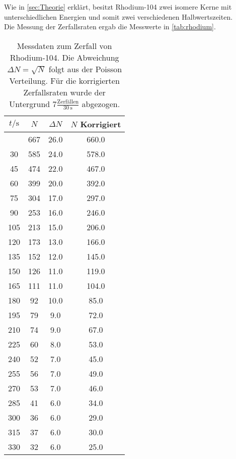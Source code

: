Wie in \autoref{sec:Theorie} erklärt, besitzt Rhodium-104 zwei isomere Kerne mit unterschiedlichen 
Energien und somit zwei verschiedenen Halbwertszeiten.
\\
Die Messung der Zerfallsraten ergab die Messwerte in \autoref{tab:rhodium}.
\begin{longtable}{c c c c}
	\caption{Messdaten zum Zerfall von Rhodium-104. Die Abweichung $\Delta N = \sqrt{N}$ folgt
		aus der Poisson Verteilung. Für die korrigierten Zerfallsraten wurde der Untergrund 
	$7 \frac{\text{Zerfällen}}{\SI{30}{\second}}$ abgezogen.} \label{tab:rhodium} \\
		\hline
		$t / \si{\second}$ & $N$ & $\Delta N$ &$N$ Korrigiert \\
		\hline
		\endhead
		\hline
		\endfoot
		15  	& 667  	& 26.0         	& 660.0 \\
		 30  	& 585  	& 24.0         	& 578.0 \\
		 45  	& 474  	& 22.0         	& 467.0 \\
		 60  	& 399  	& 20.0         	& 392.0 \\
		 75  	& 304  	& 17.0         	& 297.0 \\
		 90  	& 253  	& 16.0         	& 246.0 \\
		105  	& 213  	& 15.0         	& 206.0 \\
		120  	& 173  	& 13.0         	& 166.0 \\
		135  	& 152  	& 12.0         	& 145.0 \\
		150  	& 126  	& 11.0         	& 119.0 \\
		165  	& 111  	& 11.0         	& 104.0 \\
		180  	&  92  	& 10.0         	&  85.0 \\
		195  	&  79  	&  9.0         	&  72.0 \\
		210  	&  74  	&  9.0         	&  67.0 \\
		225  	&  60  	&  8.0         	&  53.0 \\
		240  	&  52  	&  7.0         	&  45.0 \\
		255  	&  56  	&  7.0         	&  49.0 \\
		270  	&  53  	&  7.0         	&  46.0 \\
		285  	&  41  	&  6.0         	&  34.0 \\
		300  	&  36  	&  6.0         	&  29.0 \\
		315  	&  37  	&  6.0         	&  30.0 \\
		330  	&  32  	&  6.0         	&  25.0 \\

\end{longtable}
